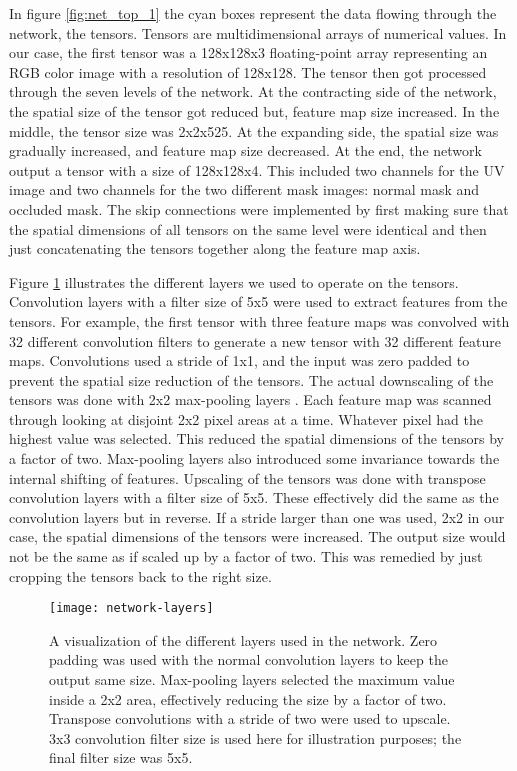In figure \ref{fig:net_top_1} the cyan boxes represent the data flowing through the network, the tensors. Tensors are multidimensional arrays of numerical values. In our case, the first tensor was a 128x128x3 floating-point array representing an RGB color image with a resolution of 128x128. The tensor then got processed through the seven levels of the network. At the contracting side of the network, the spatial size of the tensor got reduced but, feature map size increased. In the middle, the tensor size was 2x2x525. At the expanding side, the spatial size was gradually increased, and feature map size decreased. At the end, the network output a tensor with a size of 128x128x4. This included two channels for the UV image and two channels for the two different mask images: normal mask and occluded mask. The skip connections were implemented by first making sure that the spatial dimensions of all tensors on the same level were identical and then just concatenating the tensors together along the feature map axis.

Figure \ref{fig:network_layers_1} illustrates the different layers we used to operate on the tensors. Convolution layers with a filter size of 5x5 were used to extract features from the tensors. For example, the first tensor with three feature maps was convolved with 32 different convolution filters to generate a new tensor with 32 different feature maps. Convolutions used a stride of 1x1, and the input was zero padded to prevent the spatial size reduction of the tensors. The actual downscaling of the tensors was done with 2x2 max-pooling layers \cite{Goodfellow2016}. Each feature map was scanned through looking at disjoint 2x2 pixel areas at a time. Whatever pixel had the highest value was selected. This reduced the spatial dimensions of the tensors by a factor of two. Max-pooling layers also introduced some invariance towards the internal shifting of features. Upscaling of the tensors was done with transpose convolution layers with a filter size of 5x5. These effectively did the same as the convolution layers but in reverse. If a stride larger than one was used, 2x2 in our case, the spatial dimensions of the tensors were increased. The output size would not be the same as if scaled up by a factor of two. This was remedied by just cropping the tensors back to the right size.

\begin{figure}
    \texttt{[image: network-layers]}
    \caption[Network layers]{A visualization of the different layers used in the network. Zero padding was used with the normal convolution layers to keep the output same size. Max-pooling layers selected the maximum value inside a 2x2 area, effectively reducing the size by a factor of two. Transpose convolutions with a stride of two were used to upscale. 3x3 convolution filter size is used here for illustration purposes; the final filter size was 5x5.}
    \label{fig:network_layers_1}
\end{figure}

